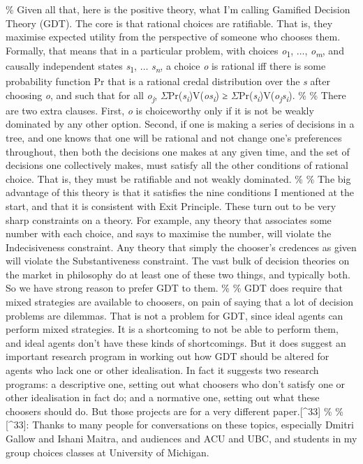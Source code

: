 \documentclass[
  12pt,
  letterpaper,
  DIV=11,
  numbers=noendperiod]{scrreprt}
\begin{document}
\% Given all that, here is the positive theory, what I'm calling
Gamified Decision Theory (GDT). The core is that rational choices are
ratifiable. That is, they maximise expected utility from the perspective
of someone who chooses them. Formally, that means that in a particular
problem, with choices \emph{o}\textsubscript{1}, \(\dots\),
\emph{o\textsubscript{m}}, and causally independent states
\emph{s}\textsubscript{1}, \(\dots\) \emph{s\textsubscript{n}}, a choice
\emph{o} is rational iff there is some probability function Pr that is a
rational credal distribution over the \emph{s} after choosing \emph{o},
and such that for all \emph{o\textsubscript{j}},
\(\Sigma\)Pr(\emph{s\textsubscript{i}})V(\emph{os\textsubscript{i}}) ≥
\(\Sigma\)Pr(\emph{s\textsubscript{i}})V(\emph{o\textsubscript{j}s\textsubscript{i}}).
\% \% There are two extra clauses. First, \emph{o} is choiceworthy only
if it is not be weakly dominated by any other option. Second, if one is
making a series of decisions in a tree, and one knows that one will be
rational and not change one's preferences throughout, then both the
decisions one makes at any given time, and the set of decisions one
collectively makes, must satisfy all the other conditions of rational
choice. That is, they must be ratifiable and not weakly dominated. \% \%
The big advantage of this theory is that it satisfies the nine
conditions I mentioned at the start, and that it is consistent with Exit
Principle. These turn out to be very sharp constraints on a theory. For
example, any theory that associates some number with each choice, and
says to maximise the number, will violate the Indecisiveness constraint.
Any theory that simply the chooser's credences as given will violate the
Substantiveness constraint. The vast bulk of decision theories on the
market in philosophy do at least one of these two things, and typically
both. So we have strong reason to prefer GDT to them. \% \% GDT does
require that mixed strategies are available to choosers, on pain of
saying that a lot of decision problems are dilemmas. That is not a
problem for GDT, since ideal agents can perform mixed strategies. It is
a shortcoming to not be able to perform them, and ideal agents don't
have these kinds of shortcomings. But it does suggest an important
research program in working out how GDT should be altered for agents who
lack one or other idealisation. In fact it suggests two research
programs: a descriptive one, setting out what choosers who don't satisfy
one or other idealisation in fact do; and a normative one, setting out
what these choosers should do. But those projects are for a very
different paper.{[}\^{}33{]} \% \% {[}\^{}33{]}: Thanks to many people
for conversations on these topics, especially Dmitri Gallow and Ishani
Maitra, and audiences and ACU and UBC, and students in my group choices
classes at University of Michigan.
\end{document}
